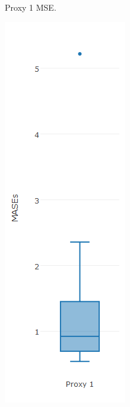 \begin{figure}[!h]
{\begin{subfigure}{.25\linewidth}
  \caption{Proxy 1 MSE.}
  \label{fig:bp1c}
\end{subfigure}%
\begin{subfigure}{.25\linewidth}
  \centering
  \includegraphics[width=\linewidth]{img/6msigmaMasebpNaive.png}

\end{subfigure}}
\end{figure}
